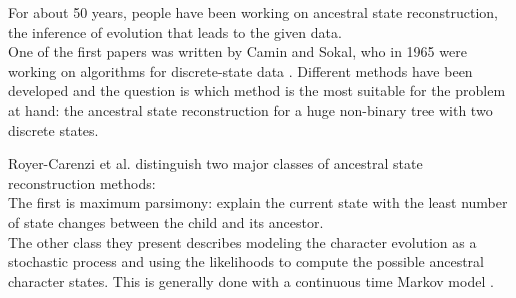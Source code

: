   For about 50 years, people have been working on ancestral state reconstruction, the inference of 
    evolution that leads to the given data. \\
  One of the first papers was written by Camin and Sokal, who in 1965 were working on algorithms for 
    discrete-state data \cite{Camin1965}. Different methods have been developed and the question is 
    which method is the most suitable for the problem at hand: the ancestral state reconstruction 
    for a huge non-binary tree with two discrete states.
  


  Royer-Carenzi et al. distinguish two major classes of ancestral state reconstruction methods: \\
  The first is maximum parsimony: explain the current state with the least number of state changes 
    between the child and its ancestor. \\
  The other class they present describes modeling the character evolution as a stochastic process 
    and using the likelihoods to compute the possible ancestral character states. This is generally 
    done with a continuous time Markov model \cite{RoyerCarenzi2013}. \\
    
